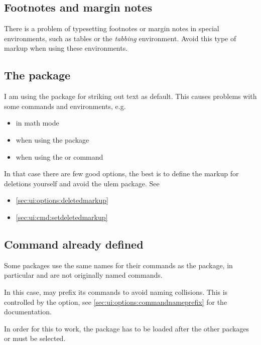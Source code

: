 \subsection{Footnotes and margin notes}

There is a problem of typesetting footnotes or margin notes in special environments, such as tables or the \emph{tabbing} environment.
Avoid this type of markup when using these environments.


\subsection{The  package}

I am using the  package for striking out text as default.
This causes problems with some commands and environments, e.g.

\begin{itemize}
	\item in math mode
	\item when using the  package
	\item when using the  or  command
\end{itemize}

In that case there are few good options, the best is to define the markup for deletions yourself and avoid the ulem package.
See

\begin{itemize}
	\item \autoref{sec:ui:options:deletedmarkup}
	\item \autoref{sec:ui:cmd:setdeletedmarkup}
\end{itemize}


\subsection{Command already defined}

Some packages use the same names for their commands as the  package, in particular  and  are not originally named commands.

In this case,  may prefix its commands to avoid naming collisions.
This is controlled by the  option, see \autoref{sec:ui:options:commandnameprefix} for the documentation.

In order for this to work, the  package has to be loaded after the other packages or  must be selected.


